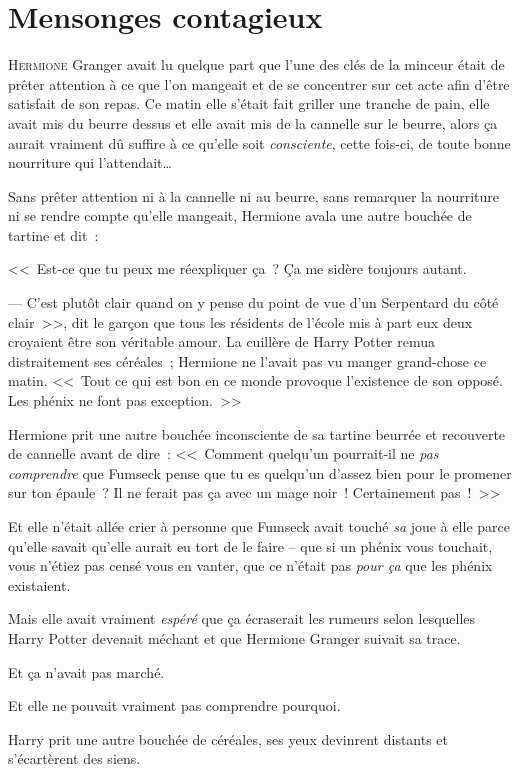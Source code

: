 \chapter{Mensonges contagieux}

\lettrine{H}{ermione} Granger avait lu quelque part que l'une des clés de la minceur était de prêter attention à ce que l'on mangeait et de se concentrer sur cet acte afin d'être satisfait de son repas. Ce matin elle s'était fait griller une tranche de pain, elle avait mis du beurre dessus et elle avait mis de la cannelle sur le beurre, alors ça aurait vraiment dû suffire à ce qu'elle soit \emph{consciente}, cette fois-ci, de toute bonne nourriture qui l'attendait…

Sans prêter attention ni à la cannelle ni au beurre, sans remarquer la nourriture ni se rendre compte qu'elle mangeait, Hermione avala une autre bouchée de tartine et dit~:

<<~Est-ce que tu peux me réexpliquer ça~? Ça me sidère toujours autant.

--- C'est plutôt clair quand on y pense du point de vue d'un Serpentard du côté clair~>>, dit le garçon que tous les résidents de l'école mis à part eux deux croyaient être son véritable amour. La cuillère de Harry Potter remua distraitement ses céréales~; Hermione ne l'avait pas vu manger grand-chose ce matin. <<~Tout ce qui est bon en ce monde provoque l'existence de son opposé. Les phénix ne font pas exception.~>>

Hermione prit une autre bouchée inconsciente de sa tartine beurrée et recouverte de cannelle avant de dire~: <<~Comment quelqu'un pourrait-il ne \emph{pas comprendre} que Fumseck pense que tu es quelqu'un d'assez bien pour le promener sur ton épaule~? Il ne ferait pas ça avec un mage noir~! Certainement pas~!~>>

Et elle n'était allée crier à personne que Fumseck avait touché \emph{sa} joue à elle parce qu'elle savait qu'elle aurait eu tort de le faire -- que si un phénix vous touchait, vous n'étiez pas censé vous en vanter, que ce n'était pas \emph{pour ça} que les phénix existaient.

Mais elle avait vraiment \emph{espéré} que ça écraserait les rumeurs selon lesquelles Harry Potter devenait méchant et que Hermione Granger suivait sa trace.

Et ça n'avait pas marché.

Et elle ne pouvait vraiment pas comprendre pourquoi.

Harry prit une autre bouchée de céréales, ses yeux devinrent distants et s'écartèrent des siens.

